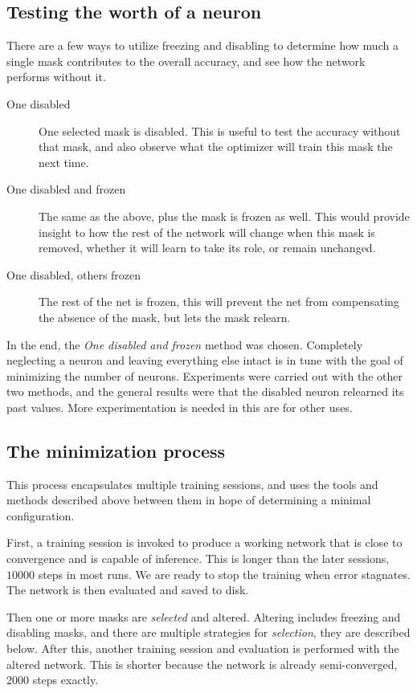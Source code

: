 \documentclass[12pt]{report}
\begin{document}
\subsection{Testing the worth of a neuron}
There are a few ways to utilize freezing and disabling to determine how much a single mask contributes to the overall accuracy, and see how the network performs without it.
\begin{description}
	\item[One disabled] One selected mask is disabled. This is useful to test the accuracy without that mask, and also observe what the optimizer will train this mask the next time.
	\item[One disabled and frozen] The same as the above, plus the mask is frozen as well. This would provide insight to how the rest of the network will change when this mask is removed, whether it will learn to take its role, or remain unchanged.
	\item[One disabled, others frozen] The rest of the net is frozen, this will prevent the net from compensating the absence of the mask, but lets the mask relearn.
\end{description}
In the end, the \textit{One disabled and frozen} method was chosen. Completely neglecting a neuron and leaving everything else intact is in tune with the goal of minimizing the number of neurons. Experiments were carried out with the other two methods, and the general results were that the disabled neuron relearned its past values. More experimentation is needed in this are for other uses.
\subsection{The minimization process}
This process encapsulates multiple training sessions, and uses the tools and methods described above between them in hope of determining a minimal configuration.

First, a training session is invoked to produce a working network that is close to convergence and is capable of inference. This is longer than the later sessions, $10000$ steps in most runs. We are ready to stop the training when error stagnates. The network is then evaluated and saved to disk.

Then one or more masks are \textit{selected} and altered. Altering includes freezing and disabling masks, and there are multiple strategies for \textit{selection}, they are described below. After this, another training session and evaluation is performed with the altered network. This is shorter because the network is already semi-converged, $2000$ steps exactly.
\end{document}
